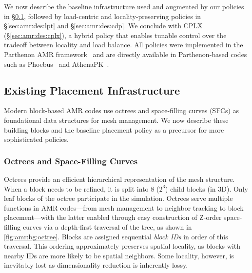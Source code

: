 We now describe the baseline infrastructure used and augmented by our policies in
\S\ref{sec:amr:des:bg}, followed by load-centric and locality-preserving policies in
\S\ref{sec:amr:des:lpt} and \S\ref{sec:amr:des:cdp}.
We conclude with CPLX (\S\ref{sec:amr:des:cplx}), a hybrid policy that enables tunable control over the
tradeoff between locality and load balance.
All policies were implemented in the Parthenon AMR framework~\cite{Grete2023:Parthenon} and are
directly available in Parthenon-based codes such as Phoebus~\cite{Barke2024:Phoebus} and
AthenaPK~\cite{Grete2023:Parthenon}.

\vspace{-5pt}

\subsection{Existing Placement Infrastructure}\label{sec:amr:des:bg}

Modern block-based AMR codes use octrees and space-filling curves (SFCs) as foundational data
structures for mesh management.
We now describe these building blocks and the baseline placement policy
as a precursor for more sophisticated policies.

\figoctree

\subsubsection{Octrees and Space-Filling Curves}

Octrees provide an efficient hierarchical representation of the mesh structure.
When a block needs to be refined, it is split into 8 ($2^3$) child blocks (in 3D).
Only leaf blocks of the octree participate in the simulation.
Octrees serve multiple functions in AMR codes---from mesh management to neighbor tracking to
block placement---with the latter enabled through easy construction of Z-order space-filling
curves via a depth-first traversal of the tree, as shown in \cref{fig:amr:bg:octree}.
Blocks are assigned sequential \emph{block IDs} in order of this traversal.
This ordering approximately preserves spatial locality, as blocks with nearby IDs are more likely
to be spatial neighbors.
Some locality, however, is inevitably lost as dimensionality reduction is inherently lossy.

